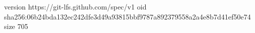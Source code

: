 version https://git-lfs.github.com/spec/v1
oid sha256:06b24bda132ec242dfe3d49a93815bbf9787a892379558a2a4e8b7d41ef50e74
size 705
